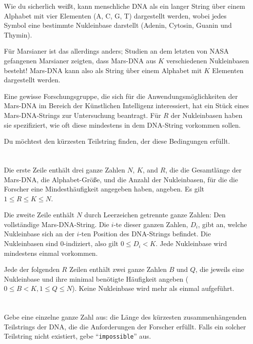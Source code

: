 \ifx\boi\undefined\fi
\def\version{jury-1}
Wie du sicherlich weißt, kann menschliche DNA als ein langer String über einem Alphabet mit vier Elementen ({A, C, G, T}) dargestellt werden, wobei jedes Symbol eine bestimmte Nukleinbase darstellt (Adenin, Cytosin, Guanin und Thymin).

Für Marsianer ist das allerdings anders; Studien an dem letzten von NASA gefangenen Marsianer zeigten, dass Mars-DNA aus $K$ verschiedenen Nukleinbasen besteht! Mars-DNA kann also als String über einem Alphabet mit $K$ Elementen dargestellt werden.

Eine gewisse Forschungsgruppe, die sich für die Anwendungsmöglichkeiten der Mars-DNA im Bereich der Künstlichen Intelligenz interessiert, hat ein Stück eines Mars-DNA-Strings zur Untersuchung beantragt. Für $R$ der Nukleinbasen haben sie spezifiziert, wie oft diese mindestens in dem DNA-String vorkommen sollen.

Du möchtest den kürzesten Teilstring finden, der diese Bedingungen erfüllt.

\section*{}
Die erste Zeile enthält drei ganze Zahlen $N$, $K$, and $R$, die die Gesamtlänge der Mars-DNA, die Alphabet-Größe, und die Anzahl der Nukleinbasen, für die die Forscher eine Mindesthäufigkeit angegeben haben, angeben. Es gilt $1 \le R \le K \le N$.

Die zweite Zeile enthält $N$ durch Leerzeichen getrennte ganze Zahlen: Den vollständige Mars-DNA-String.
Die $i$-te dieser ganzen Zahlen, $D_i$, gibt an, welche Nukleinbase sich an der $i$-ten Position des DNA-Strings befindet.
Die Nukleinbasen sind $0$-indiziert, also gilt $0 \leq D_i < K$. Jede Nukleinbase wird mindestens einmal vorkommen.

Jede der folgenden $R$ Zeilen enthält zwei ganze Zahlen $B$ und $Q$, die jeweils eine Nukleinbase und ihre minimal benötigte Häufigkeit angeben ($0 \le B < K, 1 \le Q \le N$).
Keine Nukleinbase wird mehr als einmal aufgeführt.

\section*{\outputsection}
Gebe eine einzelne ganze Zahl aus: die Länge des kürzesten zusammenhängenden Teilstrings der DNA, die die Anforderungen der Forscher erfüllt.
Falls ein solcher Teilstring nicht existiert, gebe ``\texttt{impossible}'' aus.

